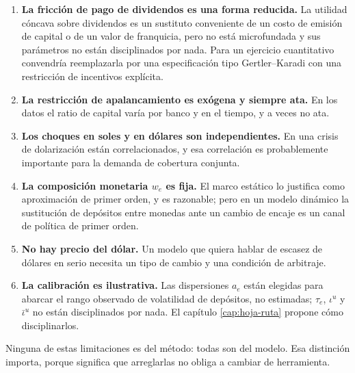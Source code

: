 \begin{enumerate}[leftmargin=1.4em]
\item \textbf{La fricción de pago de dividendos es una forma reducida.} La
utilidad cóncava sobre dividendos es un sustituto conveniente de un costo de
emisión de capital o de un valor de franquicia, pero no está microfundada y sus
parámetros no están disciplinados por nada. Para un ejercicio cuantitativo
convendría reemplazarla por una especificación tipo Gertler--Karadi con una
restricción de incentivos explícita.
\item \textbf{La restricción de apalancamiento es exógena y siempre ata.} En los
datos el ratio de capital varía por banco y en el tiempo, y a veces no ata.
\item \textbf{Los choques en soles y en dólares son independientes.} En una
crisis de dolarización están correlacionados, y esa correlación es probablemente
importante para la demanda de cobertura conjunta.
\item \textbf{La composición monetaria $w_e$ es fija.} El marco estático lo
justifica como aproximación de primer orden, y es razonable; pero en un modelo
dinámico la sustitución de depósitos entre monedas ante un cambio de encaje es un
canal de política de primer orden.
\item \textbf{No hay precio del dólar.} Un modelo que quiera hablar de escasez de
dólares en serio necesita un tipo de cambio y una condición de arbitraje.
\item \textbf{La calibración es ilustrativa.} Las dispersiones $a_e$ están
elegidas para abarcar el rango observado de volatilidad de depósitos, no
estimadas; $\tau_e$, $\iota^u$ y $\bar\iota^u$ no están disciplinados por nada.
El capítulo \ref{cap:hoja-ruta} propone cómo disciplinarlos.
\end{enumerate}

Ninguna de estas limitaciones es del método: todas son del modelo. Esa distinción
importa, porque significa que arreglarlas no obliga a cambiar de herramienta.
